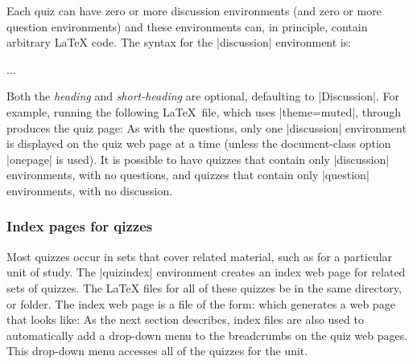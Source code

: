 \documentclass[svgnames]{article}
\begin{document}
  Each quiz can have zero or more discussion
  environments (and zero or more question environments) and these
  environments can, in principle, contain arbitrary \LaTeX{} code. The
  syntax for the \LatexCode|discussion| environment is:
  \begin{latexcode}
    \begin{dicussion}
      ...
    \end{dicussion}
  \end{latexcode}
  Both the \textit{heading} and \textit{short-heading} are optional,
  defaulting to \LatexCode|Discussion|.
  For example, running the following \LaTeX\ file, which uses
  \LatexCode|theme=muted|, through \WebQuiz
  produces the quiz page:
  As with the questions, only one \LatexCode|discussion| environment is
  displayed on the quiz web page at a time (unless the document-class
  option \LatexCode|onepage| is used). It is possible to have quizzes
  that contain only \LatexCode|discussion| environments, with no
  questions, and quizzes that contain only \LatexCode|question|
  environments, with no discussion.

  \subsubsection{Index pages for qizzes}\label{SS:index}


    Most quizzes occur in sets that cover related material, such as for
    a particular unit of study. The \LatexCode|quizindex| environment
    creates an index web page for related sets of quizzes. The \LaTeX{}
    files for all of these quizzes be in the same directory, or folder.
    The index web page is a \WebQuiz file of the form:
    which generates a web page that looks like:
    As the next section describes, index files are also used to
    automatically add a drop-down menu to the breadcrumbs on the quiz web
    pages. This drop-down menu accesses all of the quizzes for the unit.
\end{document}
